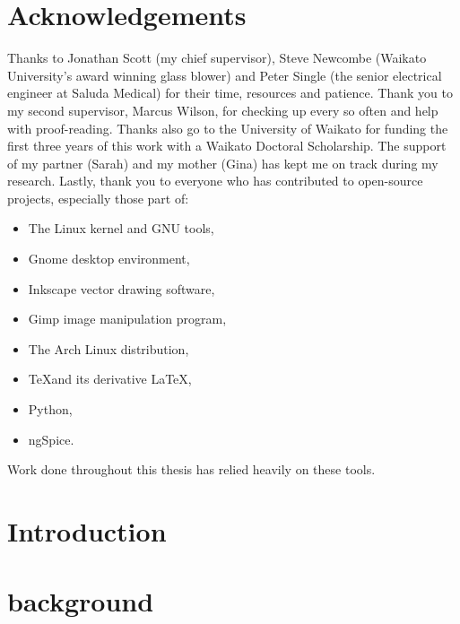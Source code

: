 \chapter*{Acknowledgements}
Thanks to Jonathan Scott (my chief supervisor), Steve Newcombe (Waikato University's award winning glass blower) and Peter Single (the senior electrical engineer at Saluda Medical) for their time, resources and patience.
Thank you to my second supervisor, Marcus Wilson, for checking up every so often and help with proof-reading.
Thanks also go to the University of Waikato for funding the first three years of this work with a Waikato Doctoral Scholarship.
The support of my partner (Sarah) and my mother (Gina) has kept me on track during my research.
Lastly, thank you to everyone who has contributed to open-source projects, especially those part of:
\begin{itemize}
\item The Linux kernel and GNU tools,
\item Gnome desktop environment,
\item Inkscape vector drawing software,
\item Gimp image manipulation program,
\item The Arch Linux distribution,
\item \TeX \space and its derivative \LaTeX,
\item Python,
\item ngSpice.
\end{itemize}
Work done throughout this thesis has relied heavily on these tools.

\tableofcontents{}
\listoffigures
\listoftables
\doublespacing



 \chapter{Introduction}
   \label{chap:introduction_main}
   


 \chapter{background}
   \label{chap:background}
   

